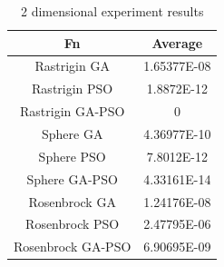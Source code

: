 \documentclass[runningheads]{llncs}
\begin{document}


\begin{table}[htp]
  \caption{2 dimensional experiment results}
  \label{table:resultados-2}
  \centering
  \begin{tabular}{|c|c|}
  \hline
  Fn & Average \\
  \hline
  \hline
  Rastrigin GA & 1.65377E-08\\
  \hline
  Rastrigin PSO & 1.8872E-12\\
  \hline
  Rastrigin GA-PSO & 0\\
  \hline
  Sphere GA  & 4.36977E-10\\
  \hline
  Sphere PSO & 7.8012E-12\\
  \hline
  Sphere GA-PSO & 4.33161E-14\\
  \hline
  Rosenbrock GA & 1.24176E-08\\
  \hline
  Rosenbrock PSO & 2.47795E-06\\
  \hline
  Rosenbrock GA-PSO & 6.90695E-09\\
  \hline
  \end{tabular}
  \end{table}
  

    


\end{document}

